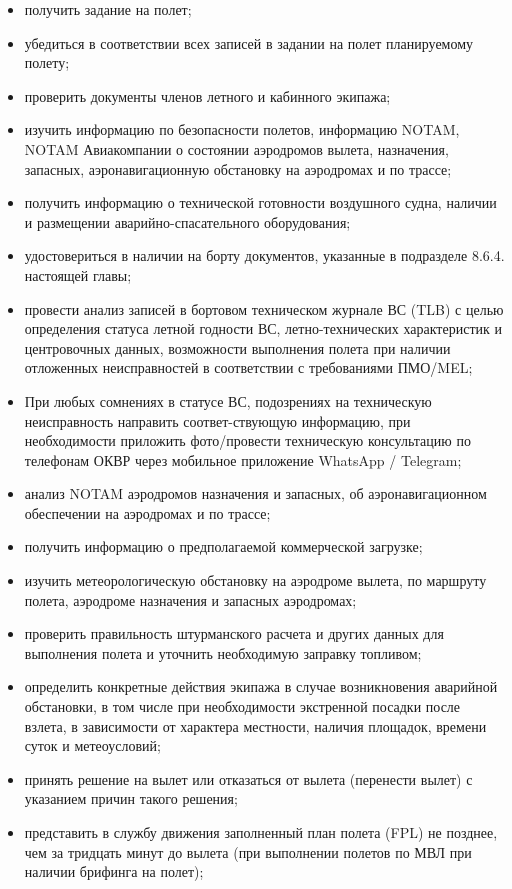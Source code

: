 \begin{itemize}
    \item получить задание на полет;
    \item убедиться в соответствии всех записей в задании на полет планируемому полету;
    \item проверить документы членов летного и кабинного экипажа; 
    \item изучить информацию по безопасности полетов, информацию NOTAM, NOTAM Авиакомпании о состоянии аэродромов вылета, назначения, запасных, аэронавигационную обстановку на аэродромах и по трассе; 
    \item получить информацию о технической готовности воздушного судна, наличии и размещении аварийно-спасательного оборудования; 
    \item удостовериться в наличии на борту документов, указанные в подразделе 8.6.4. настоящей главы;
    \item провести анализ записей в бортовом техническом журнале ВС (TLB) с целью определения статуса летной годности ВС, летно-технических характеристик и центровочных данных, возможности выполнения полета при наличии отложенных неисправностей в соответствии с требованиями ПМО/MEL;
    \item При любых сомнениях в статусе ВС, подозрениях на техническую неисправность направить соответ-ствующую информацию, при необходимости приложить фото/провести техническую консультацию по телефонам ОКВР через мобильное приложение WhatsApp / Telegram;
    \item анализ NOTAM аэродромов назначения и запасных, об аэронавигационном обеспечении на аэродромах и по трассе; 
    \item получить информацию о предполагаемой коммерческой загрузке;
    \item изучить метеорологическую обстановку на аэродроме вылета, по маршруту полета, аэродроме назначения и запасных аэродромах;
    \item проверить правильность штурманского расчета и других данных для выполнения полета и уточнить необходимую заправку топливом;
    \item определить конкретные действия экипажа в случае возникновения аварийной обстановки, в том числе при необходимости экстренной посадки после взлета, в зависимости от характера местности, наличия площадок, времени суток и метеоусловий;
    \item принять решение на вылет или отказаться от вылета (перенести вылет) с указанием причин такого решения;
    \item представить в службу движения заполненный план полета (FPL) не позднее, чем за тридцать минут до вылета (при выполнении полетов по МВЛ при наличии брифинга на полет);

\end{itemize}
